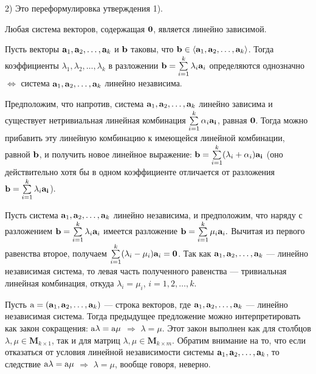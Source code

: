 2) Это переформулировка утверждения 1).
\edok

\begin{sled}
Любая система векторов, содержащая $\mathbf{0}$, является линейно зависимой.
\end{sled}

\begin{predl}\label{p7_2_3}
Пусть векторы $\mathbf{a}_1, \mathbf{a}_2, \ldots, \mathbf{a}_k $ и $\mathbf{b}$ таковы, что 
$\mathbf{b}\in \langle \mathbf{a}_1, \mathbf{a}_2, \ldots, \mathbf{a}_k  \rangle$.
Тогда коэффициенты $\lambda_1, \lambda_2, \ldots , \lambda_k$
в разложении
$\mathbf{b}= \sum\limits_{i=1}^{k} \lambda_i \mathbf{a}_i$
определяются однозначно $\Leftrightarrow$ 
система $\mathbf{a}_1, \mathbf{a}_2, \ldots, \mathbf{a}_k $ линейно независима.
\end{predl}
\dok
\dokright
Предположим, что напротив, 
система $\mathbf{a}_1, \mathbf{a}_2, \ldots, \mathbf{a}_k $ линейно зависима и существует нетривиальная линейная комбинация
$\sum\limits_{i=1}^{k} \alpha_i \mathbf{a_i}$, равная $\mathbf{0}$. 
Тогда можно прибавить эту линейную комбинацию к имеющейся линейной комбинации, равной $\mathbf{b}$, 
и получить новое линейное выражение: 
$\mathbf{b}= \sum\limits_{i=1}^{k} (\lambda_i+\alpha_i) \mathbf{a_i}$ (оно действительно хотя бы в одном
коэффициенте отличается от разложения
$\mathbf{b}= \sum\limits_{i=1}^{k} \lambda_i \mathbf{a_i}$).

\dokleft
Пусть система $\mathbf{a}_1, \mathbf{a}_2, \ldots, \mathbf{a}_k $ линейно независима, и предположим, что наряду с разложением
$\mathbf{b}= \sum\limits_{i=1}^{k} \lambda_i \mathbf{a}_i$
имеется разложение
$\mathbf{b}= \sum\limits_{i=1}^{k} \mu_i \mathbf{a}_i.$
Вычитая из первого равенства второе,  получаем
$\sum\limits_{i=1}^{k} (\lambda_i -\mu_i) \mathbf{a}_i=\mathbf{0}$.
Так как $\mathbf{a}_1, \mathbf{a}_2, \ldots, \mathbf{a}_k$ --- линейно независимая система, то левая часть
полученного равенства --- тривиальная линейная комбинация, откуда
$\lambda_i =\mu_i$, $i=1, 2, \ldots , k$.
\edok

\otstup

Пусть $\mathrm{a} = (\mathbf{a}_1, \mathbf{a}_2, \ldots , \mathbf{a}_k)$ --- строка векторов, 
где $\mathbf{a}_1, \mathbf{a}_2, \ldots , \mathbf{a}_k$ --- линейно независимая система.
Тогда предыдущее предложение можно интерпретировать как закон сокращения:
 $\mathrm{a} \lambda = \mathrm{a} \mu$ $\Rightarrow$ $\lambda = \mu$.
Этот закон выполнен как для столбцов $\lambda , \mu \in \mathbf{M}_{k\times 1}$, так и для матриц $\lambda , \mu \in \mathbf{M}_{k\times m}$.
Обратим внимание на то, что если отказаться от условия линейной независимости системы
$\mathbf{a}_1, \mathbf{a}_2, \ldots , \mathbf{a}_k$, то следствие $\mathrm{a} \lambda = \mathrm{a} \mu$ $\Rightarrow$ $\lambda = \mu$,
вообще говоря, неверно.

